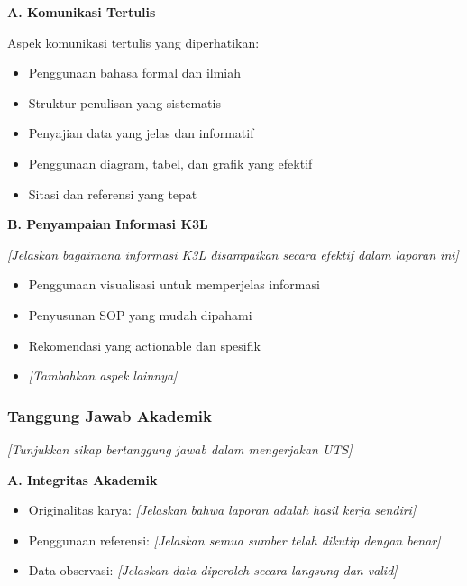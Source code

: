 \textbf{A. Komunikasi Tertulis}

Aspek komunikasi tertulis yang diperhatikan:
\begin{itemize}
    \item Penggunaan bahasa formal dan ilmiah
    \item Struktur penulisan yang sistematis
    \item Penyajian data yang jelas dan informatif
    \item Penggunaan diagram, tabel, dan grafik yang efektif
    \item Sitasi dan referensi yang tepat
\end{itemize}

\vspace{0.5cm}

\textbf{B. Penyampaian Informasi K3L}

\textit{[Jelaskan bagaimana informasi K3L disampaikan secara efektif dalam laporan ini]}

\begin{itemize}
    \item Penggunaan visualisasi untuk memperjelas informasi
    \item Penyusunan SOP yang mudah dipahami
    \item Rekomendasi yang actionable dan spesifik
    \item \textit{[Tambahkan aspek lainnya]}
\end{itemize}

\vspace{0.5cm}

\subsubsection{Tanggung Jawab Akademik}

\textit{[Tunjukkan sikap bertanggung jawab dalam mengerjakan UTS]}

\textbf{A. Integritas Akademik}

\begin{itemize}
    \item Originalitas karya: \textit{[Jelaskan bahwa laporan adalah hasil kerja sendiri]}
    \item Penggunaan referensi: \textit{[Jelaskan semua sumber telah dikutip dengan benar]}
    \item Data observasi: \textit{[Jelaskan data diperoleh secara langsung dan valid]}
\end{itemize}

\vspace{0.5cm}


